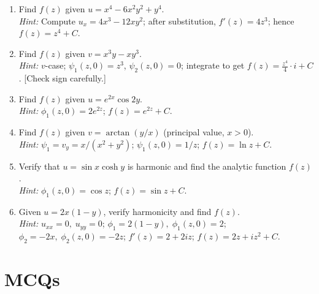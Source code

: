 \documentclass[12pt,a4paper]{article}
\begin{document}
\begin{enumerate}
  \item Find \( f(z) \) given \( u = x^4 - 6x^2y^2 + y^4 \).\\
  \textit{Hint:} Compute \( u_x = 4x^3 - 12xy^2 \); after substitution, \( f'(z) = 4z^3 \); hence \( f(z) = z^4 + C \).

  \item Find \( f(z) \) given \( v = x^3y - xy^3 \).\\
  \textit{Hint:} \( v \)-case; \( \psi_1(z,0) = z^3 \), \( \psi_2(z,0) = 0 \); integrate to get \( f(z) = \frac{z^4}{4} \cdot i + C \). [Check sign carefully.]

  \item Find \( f(z) \) given \( u = e^{2x}\cos 2y \).\\
  \textit{Hint:} \( \phi_1(z,0) = 2e^{2z} \); \( f(z) = e^{2z} + C \).

  \item Find \( f(z) \) given \( v = \arctan(y/x) \) (principal value, \( x > 0 \)).\\
  \textit{Hint:} \( \psi_1 = v_y = x/(x^2+y^2) \); \( \psi_1(z,0) = 1/z \); \( f(z) = \ln z + C \).

  \item Verify that \( u = \sin x \cosh y \) is harmonic and find the analytic function \( f(z) \).\\
  \textit{Hint:} \( \phi_1(z,0) = \cos z \); \( f(z) = \sin z + C \).

  \item Given \( u = 2x(1-y) \), verify harmonicity and find \( f(z) \).\\
  \textit{Hint:} \( u_{xx} = 0,\; u_{yy} = 0 \); \( \phi_1 = 2(1-y),\; \phi_1(z,0) = 2 \); \( \phi_2 = -2x,\; \phi_2(z,0) = -2z \); \( f'(z) = 2 + 2iz \); \( f(z) = 2z + iz^2 + C \).
\end{enumerate}

\section{MCQs}
\end{document}
